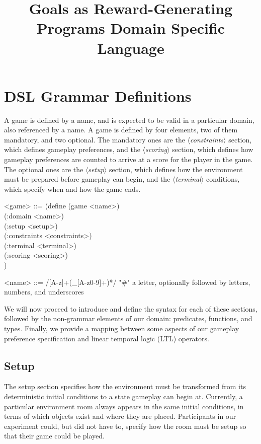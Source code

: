 \documentclass{article}
\title{Goals as Reward-Generating Programs Domain Specific Language}
\newcommand{\dsl}[1]{{\it $\langle$#1$\rangle$}}
\begin{document}
\maketitle

\section{DSL Grammar Definitions}

A game is defined by a name, and is expected to be valid in a particular domain, also referenced by a name. 
A game is defined by four elements, two of them mandatory, and two optional.
The mandatory ones are the \dsl{constraints} section, which defines gameplay preferences, and the \dsl{scoring} section, which defines how gameplay preferences are counted to arrive at a score for the player in the game.
The optional ones are the \dsl{setup} section, which defines how the environment must be prepared before gameplay can begin, and the \dsl{terminal} conditions, which specify when and how the game ends. 

\begin{grammar}
<game> ::= (define (game <name>) \\
  (:domain <name>) \\
  (:setup <setup>) \\
  (:constraints <constraints>) \\
  (:terminal <terminal>) \\
  (:scoring <scoring>) \\)

<name> ::= /[A-z]+(_[A-z0-9]+)*/ "#" a letter, optionally followed by letters, numbers, and underscores
\end{grammar}

We will now proceed to introduce and define the syntax for each of these sections, followed by the non-grammar elements of our domain: predicates, functions, and types. 
Finally, we provide a mapping between some aspects of our gameplay preference specification and linear temporal logic (LTL) operators. 

\subsection{Setup} \label{sec:setup}
The setup section specifies how the environment must be transformed from its deterministic initial conditions to a state gameplay can begin at. 
Currently, a particular environment room always appears in the same initial conditions, in terms of which objects exist and where they are placed.
Participants in our experiment could, but did not have to, specify how the room must be setup so that their game could be played.
\end{document}
